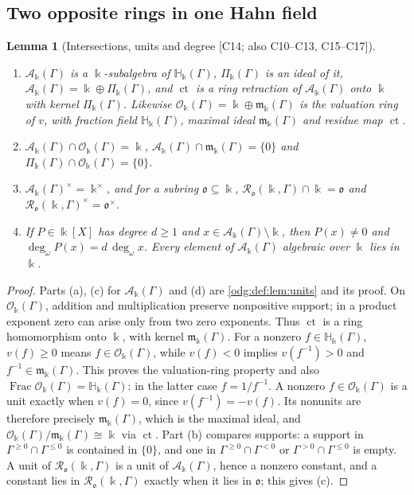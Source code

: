\documentclass[11pt,oneside]{article}
\numberwithin{equation}{section}
\newtheorem{lemma}[lemma]{Lemma}
\theoremstyle{definition}
\theoremstyle{remark}
\newcommand{\ct}{\operatorname{ct}}
\newcommand{\ddeg}{\operatorname{deg}_{\omega}}
\newcommand{\Frac}{\operatorname{Frac}}
\newcommand{\src}[1]{\textup{\textsf{\small[#1]}}}
\newcommand{\crH}{\mathbb H_\Bbbk(\Gamma)}
\newcommand{\crA}{\mathcal A_\Bbbk(\Gamma)}
\newcommand{\crP}{\Pi_\Bbbk(\Gamma)}
\newcommand{\crO}{\mathcal O_\Bbbk(\Gamma)}
\newcommand{\crm}{\mathfrak m_\Bbbk(\Gamma)}
\begin{document}
\subsection{Two opposite rings in one Hahn field}\label{odg:cr:sub:rings}

\begin{lemma}[Intersections, units and degree \src{C14; also C10--C13, C15--C17}]\label{odg:cr:lem:rings}
\begin{enumerate}[label=\textup{(\alph*)},leftmargin=*]
\item $\crA$ is a $\Bbbk$-subalgebra of $\crH$, $\crP$ is an ideal of it,
$\crA=\Bbbk\oplus\crP$, and $\ct$ is a ring retraction of $\crA$ onto $\Bbbk$ with
kernel $\crP$. Likewise $\crO=\Bbbk\oplus\crm$ is the valuation ring of $v$, with
fraction field $\crH$, maximal ideal $\crm$ and residue map $\ct$.
\item $\crA\cap\crO=\Bbbk$, $\crA\cap\crm=\{0\}$ and $\crP\cap\crO=\{0\}$.
\item $\crA^\times=\Bbbk^\times$, and for a subring $\mathfrak o\subseteq\Bbbk$,
$\mathcal R_{\mathfrak o}(\Bbbk,\Gamma)\cap\Bbbk=\mathfrak o$ and
$\mathcal R_{\mathfrak o}(\Bbbk,\Gamma)^\times=\mathfrak o^\times$.
\item If $P\in\Bbbk[X]$ has degree $d\ge1$ and $x\in\crA\setminus\Bbbk$, then
$P(x)\ne0$ and $\ddeg P(x)=d\,\ddeg x$. Every element of $\crA$ algebraic over
$\Bbbk$ lies in $\Bbbk$.
\end{enumerate}
\end{lemma}
\begin{proof}
Parts (a), (c) for $\crA$ and (d) are \cref{odg:def:lem:units} and its proof.
On $\crO$, addition and multiplication preserve nonpositive support;
in a product exponent zero can arise only from two zero exponents.
Thus $\ct$ is a ring homomorphism onto $\Bbbk$, with kernel $\crm$.
For a nonzero $f\in\crH$, $v(f)\ge0$ means $f\in\crO$, while
$v(f)<0$ implies $v(f^{-1})>0$ and $f^{-1}\in\crm$.
This proves the valuation-ring property and also $\Frac\crO=\crH$:
in the latter case $f=1/f^{-1}$. A nonzero $f\in\crO$ is a unit
exactly when $v(f)=0$, since $v(f^{-1})=-v(f)$. Its nonunits are
therefore precisely $\crm$, which is the maximal ideal, and
$\crO/\crm\cong\Bbbk$ via $\ct$.
Part (b) compares supports: a support in $\Gamma^{\ge0}\cap\Gamma^{\le0}$ is
contained in $\{0\}$, and one in $\Gamma^{\ge0}\cap\Gamma^{<0}$ or
$\Gamma^{>0}\cap\Gamma^{\le0}$ is empty. A unit of
$\mathcal R_{\mathfrak o}(\Bbbk,\Gamma)$ is a unit of $\crA$, hence a nonzero
constant, and a constant lies in $\mathcal R_{\mathfrak o}(\Bbbk,\Gamma)$ exactly
when it lies in $\mathfrak o$; this gives (c).
\end{proof}
\end{document}
